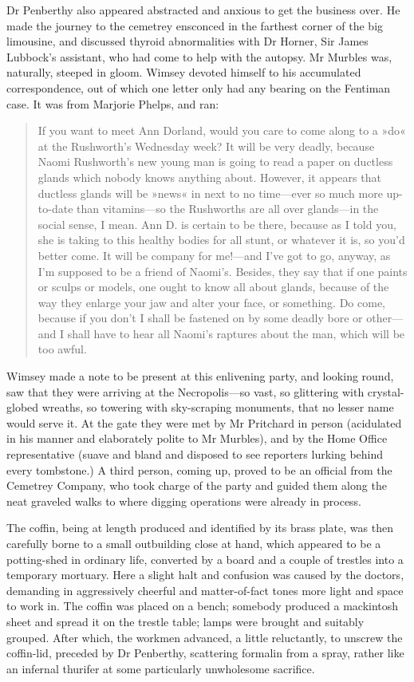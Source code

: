 Dr Penberthy also appeared abstracted and anxious to get the business over. He made the journey to the cemetrey ensconced in the farthest corner of the big limousine, and discussed thyroid abnormalities with Dr Horner, Sir James Lubbock's assistant, who had come to help with the autopsy. Mr Murbles was, naturally, steeped in gloom. Wimsey devoted himself to his accumulated correspondence, out of which one letter only had any bearing on the Fentiman case. It was from Marjorie Phelps, and ran:

\begin{quote}If you want to meet Ann Dorland, would you care to come along to a »do« at the Rushworth's Wednesday week? It will be very deadly, because Naomi Rushworth's new young man is going to read a paper on ductless glands which nobody knows anything about. However, it appears that ductless glands will be »news« in next to no time\allowbreak---\allowbreak ever so much more up-to-date than vitamins\allowbreak---\allowbreak so the Rushworths are all over glands\allowbreak---\allowbreak in the social sense, I mean. Ann D. is certain to be there, because as I told you, she is taking to this healthy bodies for all stunt, or whatever it is, so you'd better come. It will be company for me!---and I've got to go, anyway, as I'm supposed to be a friend of Naomi's. Besides, they say that if one paints or sculps or models, one ought to know all about glands, because of the way they enlarge your jaw and alter your face, or something. Do come, because if you don't I shall be fastened on by some deadly bore or other\allowbreak---\allowbreak and I shall have to hear all Naomi's raptures about the man, which will be too awful.
\end{quote}

Wimsey made a note to be present at this enlivening party, and looking round, saw that they were arriving at the Necropolis\allowbreak---\allowbreak so vast, so glittering with crystal-globed wreaths, so towering with sky-scraping monuments, that no lesser name would serve it. At the gate they were met by Mr Pritchard in person (acidulated in his manner and elaborately polite to Mr Murbles), and by the Home Office representative (suave and bland and disposed to see reporters lurking behind every tombstone.) A third person, coming up, proved to be an official from the Cemetrey Company, who took charge of the party and guided them along the neat graveled walks to where digging operations were already in process.

The coffin, being at length produced and identified by its brass plate, was then carefully borne to a small outbuilding close at hand, which appeared to be a potting-shed in ordinary life, converted by a board and a couple of trestles into a temporary mortuary. Here a slight halt and confusion was caused by the doctors, demanding in aggressively cheerful and matter-of-fact tones more light and space to work in. The coffin was placed on a bench; somebody produced a mackintosh sheet and spread it on the trestle table; lamps were brought and suitably grouped. After which, the workmen advanced, a little reluctantly, to unscrew the coffin-lid, preceded by Dr Penberthy, scattering formalin from a spray, rather like an infernal thurifer at some particularly unwholesome sacrifice.

